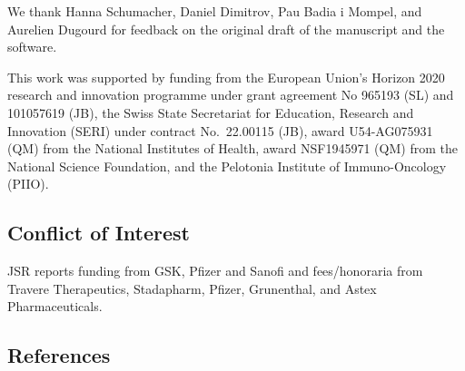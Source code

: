 We thank Hanna Schumacher, Daniel Dimitrov, Pau Badia i Mompel, and Aurelien Dugourd for feedback on the original draft of the manuscript and the software.

This work was supported by funding from the European Union's Horizon 2020 research and innovation programme under grant agreement No 965193 (SL) and 101057619 (JB), the Swiss State Secretariat for Education, Research and Innovation (SERI) under contract No.~22.00115 (JB), award U54-AG075931 (QM) from the National Institutes of Health, award NSF1945971 (QM) from the National Science Foundation, and the Pelotonia Institute of Immuno-Oncology (PIIO).

\hypertarget{conflict-of-interest}{%
\subsection{Conflict of Interest}\label{conflict-of-interest}}

JSR reports funding from GSK, Pfizer and Sanofi and fees/honoraria from Travere Therapeutics, Stadapharm, Pfizer, Grunenthal, and Astex Pharmaceuticals.

\hypertarget{references}{%
\subsection{References}\label{references}}

